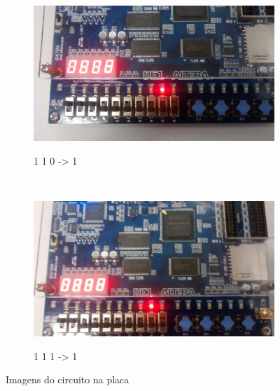 \begin{figure}
	\begin{subfigure}[b]{0.44\textwidth}
        \includegraphics[width=\textwidth]{img/cenario2/circ7}
        \label{fig:circ7}
		\caption{1 1 0 -> 1}
    \end{subfigure}
    ~
    \begin{subfigure}[b]{0.44\textwidth}
        \includegraphics[width=\textwidth]{img/cenario2/circ8}
        \label{fig:circ8}
		\caption{1 1 1 -> 1}
    \end{subfigure}


    \caption{Imagens do circuito na placa}\label{fig:fotosCircuito}
\end{figure}

